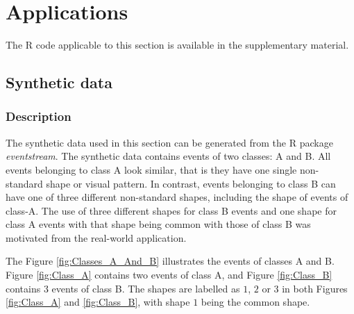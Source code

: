 \documentclass[11pt]{article}
\begin{document}
	\section{Applications} \label{sec:Experiments}
	The R code applicable to this section is available in the supplementary material.
	\subsection{Synthetic data}\label{subsec:Synthetic}
	\subsubsection{Description}
 	The synthetic data used in this section can be generated from the R package {\it eventstream}. The synthetic data contains events of two classes: A and B. All events belonging to class A look similar, that is they have one single non-standard shape or visual pattern. In contrast, events belonging to class B  can have one of three different non-standard shapes, including the shape of events of class-A. The use of three different shapes for class B events and one shape for class A events with that shape being common with those of class B was motivated from the real-world application. 
 	
 	The Figure \ref{fig:Classes_A_And_B} illustrates the events of classes A and B.  Figure \ref{fig:Class_A} contains two events of class A, and Figure \ref{fig:Class_B} contains 3 events of class B. The shapes are labelled as $1$, $2$ or $3$ in both Figures \ref{fig:Class_A} and \ref{fig:Class_B}, with shape $1$ being the common shape.
  
   
\end{document}
